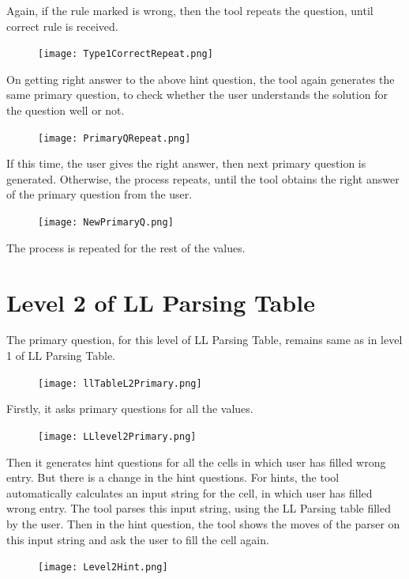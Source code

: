 Again, if the rule marked is wrong, then the tool repeats the question, until correct rule is received.

\begin{figure}
\centering
\texttt{[image: Type1CorrectRepeat.png]}
\end{figure}

On getting right answer to the above hint question, the tool again generates the same primary question, to check whether the user understands the solution for the question well or not.

\begin{figure}
\centering
\texttt{[image: PrimaryQRepeat.png]}
\end{figure}

If this time, the user gives the right answer, then next primary question is generated. Otherwise, the process repeats, until the tool obtains the right answer of the primary question from the user.

\begin{figure}
\centering
\texttt{[image: NewPrimaryQ.png]}
\end{figure}

The process is repeated for the rest of the values.

\section{Level 2 of LL Parsing Table}
The primary question, for this level of LL Parsing Table, remains same as in level 1 of LL Parsing Table. 

\begin{figure}
\centering
\texttt{[image: llTableL2Primary.png]}
\end{figure}

Firstly, it asks primary questions for all the values.
\begin{figure}
\centering
\texttt{[image: LLlevel2Primary.png]}
\end{figure}

Then it generates hint questions for all the cells in which user has filled wrong entry. But there is a change in the hint questions. For hints, the tool automatically calculates an input string for the cell, in which user has filled wrong entry. The tool parses this input string, using the LL Parsing table filled by the user. Then in the hint question, the tool shows the moves of the parser on this input string and ask the user to fill the cell again.
\begin{figure}
\centering
\texttt{[image: Level2Hint.png]}
\end{figure}

